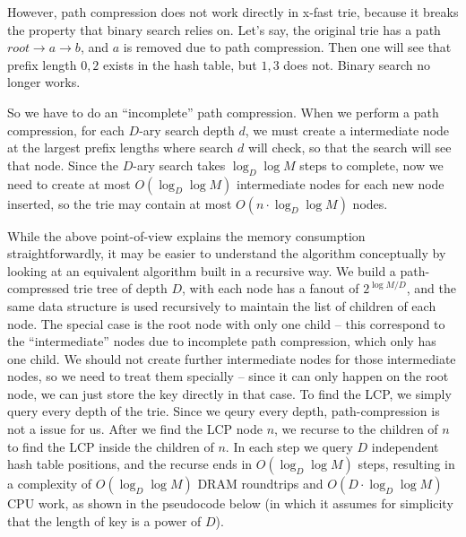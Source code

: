 \documentclass[11pt, usletter]{article}
\begin{document}
However, path compression does not work directly in x-fast trie, 
because it breaks the property that binary search relies on. 
Let's say, the original trie has a path $root\rightarrow a\rightarrow b$, 
and $a$ is removed due to path compression. 
Then one will see that prefix length $0,2$ exists in the hash table, 
but $1,3$ does not. Binary search no longer works.

So we have to do an ``incomplete'' path compression. 
When we perform a path compression, 
for each $D$-ary search depth $d$,
we must create a intermediate node at the largest prefix lengths where search $d$ will check, 
so that the search will see that node. 
Since the $D$-ary search takes $\log_D\log M$ steps to complete, 
now we need to create at most $O(\log_D\log M)$ intermediate nodes for each new node inserted, 
so the trie may contain at most $O(n\cdot \log_D\log M)$ nodes. 

While the above point-of-view explains the memory consumption straightforwardly, 
it may be easier to understand the algorithm conceptually 
by looking at an equivalent algorithm built in a recursive way. 
We build a path-compressed trie tree of depth $D$, with each node has a fanout of $2^{\log M/D}$, 
and the same data structure is used recursively to maintain the list of children of each node.
The special case is the root node with only one child -- 
this correspond to the ``intermediate'' nodes due to incomplete path compression, which only has one child. 
We should not create further intermediate nodes for those intermediate nodes, 
so we need to treat them specially -- since it can only happen on the root node, 
we can just store the key directly in that case. 
To find the LCP, we simply query every depth of the trie. 
Since we qeury every depth, path-compression is not a issue for us.
After we find the LCP node $n$, we recurse to the children of $n$ to find the LCP inside the children of $n$. 
In each step we query $D$ independent hash table positions, and the recurse ends in $O(\log_D\log M)$ steps, 
resulting in a complexity of $O(\log_D\log M)$ DRAM roundtrips and $O(D\cdot\log_D\log M)$ CPU work,
as shown in the pseudocode below (in which it assumes for simplicity that the length of key is a power of $D$).
\end{document}
